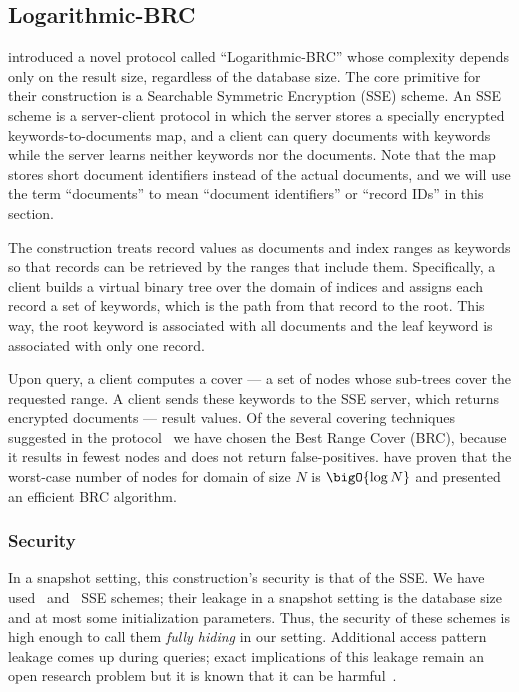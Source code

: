 \subsection{Logarithmic-BRC}

	\textcite{practical-range-search} introduced a novel protocol called ``Logarithmic\hyp{}BRC'' whose {\IO} complexity depends only on the result size, regardless of the database size.
	The core primitive for their construction is a Searchable Symmetric Encryption (SSE) scheme.
	An SSE scheme is a server-client protocol in which the server stores a specially encrypted keywords-to-documents map, and a client can query documents with keywords while the server
	learns neither keywords nor the documents.
	Note that the map stores short document identifiers instead of the actual documents, and we will use the term ``documents'' to mean ``document identifiers'' or ``record IDs'' in this section.

	The construction treats record values as documents and index ranges as keywords so that records can be retrieved by the ranges that include them.
	Specifically, a client builds a virtual binary tree over the domain of indices and assigns each record a set of keywords, which is the path from that record to the root.
	This way, the root keyword is associated with all documents and the leaf keyword is associated with only one record.

	Upon query, a client computes a cover --- a set of nodes whose sub-trees cover the requested range.
	A client sends these keywords to the SSE server, which returns encrypted documents --- result values.
	Of the several covering techniques suggested in the protocol~\cite{practical-range-search} we have chosen the Best Range Cover (BRC), because it results in fewest nodes and does not return false-positives.
	\textcite{brc} have proven that the worst-case number of nodes for domain of size $N$ is $\bigO{\log N}$ and presented an efficient BRC algorithm.

	\subsubsection{Security}
		In a snapshot setting, this construction's security is that of the SSE\@.
		We have used~\cite{cjjkrs-13} and~\cite{cjjjkrs-14} SSE schemes; their leakage in a snapshot setting is the database size and at most some initialization parameters.
		Thus, the security of these schemes is high enough to call them \emph{fully hiding} in our setting.
		Additional access pattern leakage comes up during queries; exact implications of this leakage remain an open research problem but it is known that it can be harmful~\cite{generic-attacks-kellaris}.

